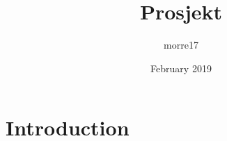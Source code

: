 \documentclass{article}
\title{Prosjekt}
\author{morre17 }
\date{February 2019}
\begin{document}
\maketitle

\section{Introduction}
\end{document}
